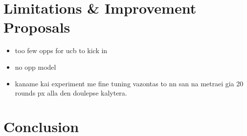 \documentclass[12pt]{article}
\numberwithin{equation}{section}
\begin{document}
	\section{Limitations \& Improvement Proposals}		\label{sec:limitations_improvements}
	
		\begin{itemize}
			\item too few opps for ucb to kick in
			\item no opp model
			\item kaname kai experiment me fine tuning vazontas to nn san na metraei gia 20 rounds px alla den doulepse kalytera.
		\end{itemize}

	\section*{Conclusion}		\label{sec:conclusion}


	
	
\end{document}
